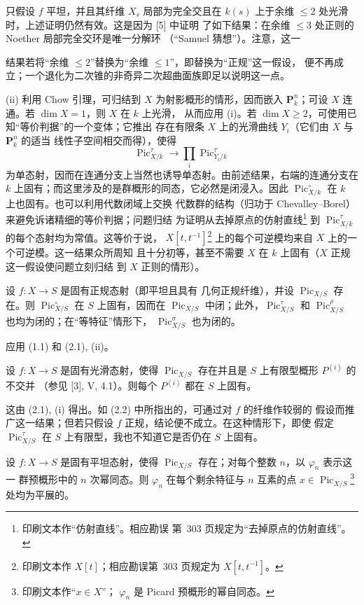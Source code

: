  只假设 $f$ 平坦，并且其纤维 $X_s$ 局部为完全交且在
$k(s)$ 上于余维 $\leq2$ 处光滑时，上述证明仍然有效。这是因为 [5] 中证明
了如下结果：在余维 $\leq3$ 处正则的 Noether 局部完全交环是唯一分解环
（“Samuel 猜想”）。注意，这一

结果若将“余维 $\leq2$”替换为“余维 $\leq1$”，即替换为“正规”这一假设，
便不再成立；一个退化为二次锥的非奇异二次超曲面族即足以说明这一点。

(ii) 利用 Chow 引理，可归结到 $X$ 为射影概形的情形，因而嵌入
$\mathbf P_k^n$；可设 $X$ 连通。若 $\dim X=1$，则 $X$ 在 $k$ 上光滑，
从而应用 (i)。若 $\dim X\geq2$，可使用已知“等价判据”的一个变体；它推出
存在有限条 $X$ 上的光滑曲线 $Y_i$（它们由 $X$ 与 $\mathbf P_k^n$ 的适当
线性子空间相交而得），使得
\[
\operatorname{Pic}_{X/k}^\tau\longrightarrow
\prod_i\operatorname{Pic}_{Y_i/k}^\tau
\]
为单态射，因而在连通分支上当然也诱导单态射。由前述结果，右端的连通分支在
$k$ 上固有；而这里涉及的是群概形的同态，它必然是闭浸入。因此
$\operatorname{Pic}_{X/k}^\circ$ 在 $k$ 上也固有。也可以利用代数闭域上交换
代数群的结构（归功于 Chevalley--Borel）来避免诉诸精细的等价判据；问题归结
为证明从去掉原点的仿射直线\footnote{印刷文本作“仿射直线”。相应勘误
第~303 页规定为“去掉原点的仿射直线”。} 到
$\operatorname{Pic}_{X/k}^\tau$ 的每个态射均为常值。这等价于说，
$X[t,t^{-1}]$\footnote{印刷文本作 $X[t]$；相应勘误第~303 页规定为
$X[t,t^{-1}]$。} 上的每个可逆模均来自 $X$ 上的一个可逆模。这一结果众所周知
且十分初等，甚至不需要 $X$ 在 $k$ 上固有（$X$ 正规这一假设使问题立刻归结
到 $X$ 正则的情形）。

 设 $f:X\longrightarrow S$ 是固有正规态射（即平坦且具有
几何正规纤维），并设 $\operatorname{Pic}_{X/S}$ 存在。则
$\operatorname{Pic}_{X/S}^\circ$ 在 $S$ 上固有，因而在
$\operatorname{Pic}_{X/S}$ 中闭；此外，$\operatorname{Pic}_{X/S}^\tau$ 和
$\operatorname{Pic}_{X/S}^\rho$ 也均为闭的；在“等特征”情形下，
$\operatorname{Pic}_{X/S}^\sigma$ 也为闭的。

应用 (1.1) 和 (2.1), (ii)。

 设 $f:X\longrightarrow S$ 是固有光滑态射，使得
$\operatorname{Pic}_{X/S}$ 存在并且是 $S$ 上有限型概形 $P^{(i)}$ 的不交并
（参见 [3], V, 4.1）。则每个 $P^{(i)}$ 都在 $S$ 上固有。

这由 (2.1), (i) 得出。如 (2.2) 中所指出的，可通过对 $f$ 的纤维作较弱的
假设而推广这一结果；但若只假设 $f$ 正规，结论便不成立。在这种情形下，即使
假定 $\operatorname{Pic}_{X/S}^\tau$ 在 $S$ 上有限型，我也不知道它是否仍在
$S$ 上固有。

 设 $f:X\longrightarrow S$ 是固有平坦态射，使得
$\operatorname{Pic}_{X/S}$ 存在；对每个整数 $n$，以 $\varphi_n$ 表示这一
群预概形中的 $n$ 次幂同态。则 $\varphi_n$ 在每个剩余特征与 $n$ 互素的点
$x\in\operatorname{Pic}_{X/S}$\footnote{印刷文本作“$x\in X$”；
$\varphi_n$ 是 Picard 预概形的幂自同态。} 处均为平展的。

